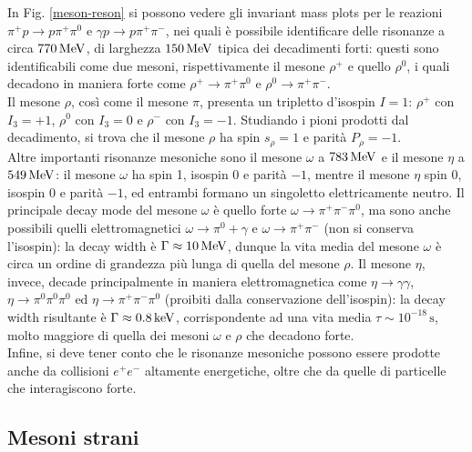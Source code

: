 In Fig. \ref{meson-reson} si possono vedere gli invariant mass plots per le reazioni $ \pi^+ p \rightarrow p \pi^+ \pi^0 $ e $ \gamma p \rightarrow p \pi^+ \pi^- $, nei quali è possibile identificare delle risonanze a circa $ 770\,\mathrm{MeV} $, di larghezza $ 150\,\mathrm{MeV} $ tipica dei decadimenti forti: questi sono identificabili come due mesoni, rispettivamente il mesone $ \rho^+ $ e quello $ \rho^0 $, i quali decadono in maniera forte come $ \rho^+ \rightarrow \pi^+ \pi^0 $ e $ \rho^0 \rightarrow \pi^+ \pi^- $.\\
Il mesone $ \rho $, così come il mesone $ \pi $, presenta un tripletto d'isospin $ I = 1 $: $ \rho^+ $ con $ I_3 = +1 $, $ \rho^0 $ con $ I_3 = 0 $ e $ \rho^- $ con $ I_3 = -1 $. Studiando i pioni prodotti dal decadimento, si trova che il mesone $ \rho $ ha spin $ s_{\rho} = 1 $ e parità $ P_{\rho} = -1 $.\\
Altre importanti risonanze mesoniche sono il mesone $ \omega $ a $ 783\,\mathrm{MeV} $ e il mesone $ \eta $ a $ 549\,\mathrm{MeV} $: il mesone $ \omega $ ha spin 1, isospin 0 e parità $ -1 $, mentre il mesone $ \eta $ spin 0, isospin 0 e parità $ -1 $, ed entrambi formano un singoletto elettricamente neutro. Il principale decay mode del mesone $ \omega $ è quello forte $ \omega \rightarrow \pi^+ \pi^- \pi^0 $, ma sono anche possibili quelli elettromagnetici $ \omega \rightarrow \pi^0 + \gamma $ e $ \omega \rightarrow \pi^+ \pi^- $ (non si conserva l'isospin): la decay width è $ \Gamma \approx 10\,\mathrm{MeV} $, dunque la vita media del mesone $ \omega $ è circa un ordine di grandezza più lunga di quella del mesone $ \rho $. Il mesone $ \eta $, invece, decade principalmente in maniera elettromagnetica come $ \eta \rightarrow \gamma \gamma $, $ \eta \rightarrow \pi^0 \pi^0 \pi^0 $ ed $ \eta \rightarrow \pi^+ \pi^- \pi^0 $ (proibiti dalla conservazione dell'isospin): la decay width risultante è $ \Gamma \approx 0.8\,\mathrm{keV} $, corrispondente ad una vita media $ \tau \sim 10^{-18} \,\text{s} $, molto maggiore di quella dei mesoni $ \omega $ e $ \rho $ che decadono forte.\\
Infine, si deve tener conto che le risonanze mesoniche possono essere prodotte anche da collisioni $ e^+ e^- $ altamente energetiche, oltre che da quelle di particelle che interagiscono forte.

\subsection{Mesoni strani}

